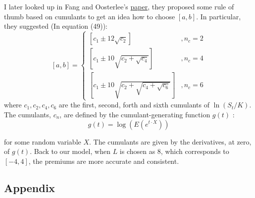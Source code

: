 \documentclass[margin=1in]{article}
\begin{document}
 I later looked up in Fang and Oosterlee's \href{http://ta.twi.tudelft.nl/mf/users/oosterle/oosterlee/COS.pdf}{paper}, they proposed some rule of thumb based on cumulants to get an idea how to choose $[a, b]$. In particular, they suggested (In equation (49)):
$$
[a, b]= \begin{cases}{\left[c_1 \pm 12 \sqrt{c_2}\right]} & , n_c=2 \\ {\left[c_1 \pm 10 \sqrt{c_2+\sqrt{c_4}}\right]} & , n_c=4 \\ {\left[c_1 \pm 10 \sqrt{c_2+\sqrt{c_4+\sqrt{c_6}}}\right]} & , n_c=6\end{cases}
$$
where $c_1, c_2, c_4, c_6$ are the first, second, forth and sixth cumulants of $\ln \left(S_t / K\right)$. The cumulants, $c_n$, are defined by the cumulant-generating function $g(t)$ :
$$
g(t)=\log \left(E\left(e^{t \cdot X}\right)\right)
$$

for some random variable $X$. The cumulants are given by the derivatives, at zero, of $g(t)$. Back to our model, when $L$ is chosen as 8, which corresponds to $[-4,4]$, the premiums are more accurate and consistent.


	\clearpage
	
	\subsection*{Appendix}
\end{document}
